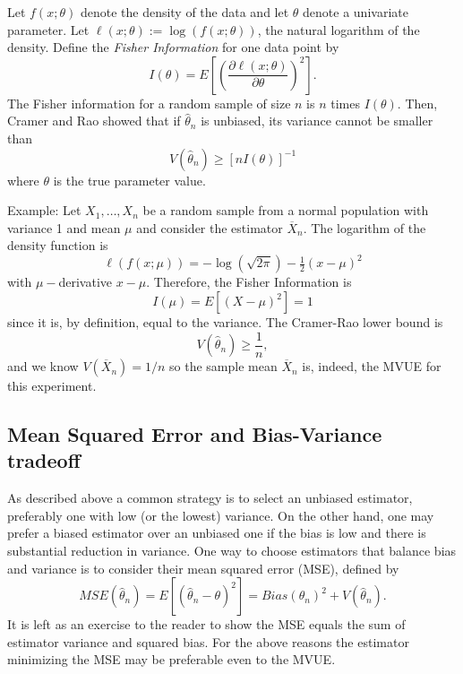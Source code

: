 \documentclass[
]{book}
\begin{document}
Let \(f(x;\theta)\) denote the density of the data and let \(\theta\) denote a univariate parameter. Let \(\ell(x;\theta) := \log(f(x;\theta))\), the natural logarithm of the density. Define the \emph{Fisher Information} for one data point by
\[I(\theta) = E\left[\left(\frac{\partial \ell(x;\theta)}{\partial\theta}\right)^2\right].\]
The Fisher information for a random sample of size \(n\) is \(n\) times \(I(\theta)\). Then, Cramer and Rao showed that if \(\hat\theta_n\) is unbiased, its variance cannot be smaller than
\[V(\hat\theta_n)\geq \left[nI(\theta)\right]^{-1}\]
where \(\theta\) is the true parameter value.

Example: Let \(X_1, \ldots, X_n\) be a random sample from a normal population with variance 1 and mean \(\mu\) and consider the estimator \(\overline X_n\). The logarithm of the density function is
\[\ell(f(x;\mu)) = -\log(\sqrt{2\pi}) - \tfrac12(x - \mu)^2\]
with \(\mu-\)derivative \(x - \mu\). Therefore, the Fisher Information is
\[I(\mu) = E[(X - \mu)^2] = 1\]
since it is, by definition, equal to the variance. The Cramer-Rao lower bound is
\[V(\hat\theta_n)\geq \frac{1}{n},\]
and we know \(V(\overline X_n) = 1/n\) so the sample mean \(\overline X_n\) is, indeed, the MVUE for this experiment.

\hypertarget{mean-squared-error-and-bias-variance-tradeoff}{%
\subsection{Mean Squared Error and Bias-Variance tradeoff}\label{mean-squared-error-and-bias-variance-tradeoff}}

As described above a common strategy is to select an unbiased estimator, preferably one with low (or the lowest) variance. On the other hand, one may prefer a biased estimator over an unbiased one if the bias is low and there is substantial reduction in variance. One way to choose estimators that balance bias and variance is to consider their mean squared error (MSE), defined by
\[MSE(\hat\theta_n) = E[(\hat\theta_n - \theta)^2] = Bias(\theta_n)^2 + V(\hat\theta_n).\]
It is left as an exercise to the reader to show the MSE equals the sum of estimator variance and squared bias. For the above reasons the estimator minimizing the MSE may be preferable even to the MVUE.
\end{document}
